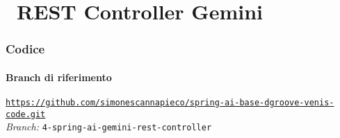 \section{\faWrench\ REST Controller Gemini} %
\label{sec:spring-ai-gemini-rest-controller}
%
\begin{frame}[fragile] \frametitle{Codice}
    \framesubtitle{Branch di riferimento}
	\begin{center}
		{\scriptsize \href{https://github.com/simonescannapieco/spring-ai-base-dgroove-venis-code.git}{\texttt{https://github.com/simonescannapieco/spring-ai-base-dgroove-venis-code.git}}}\\
		\textit{Branch:} \alert{\texttt{4-spring-ai-gemini-rest-controller}}
	\end{center}
\end{frame}